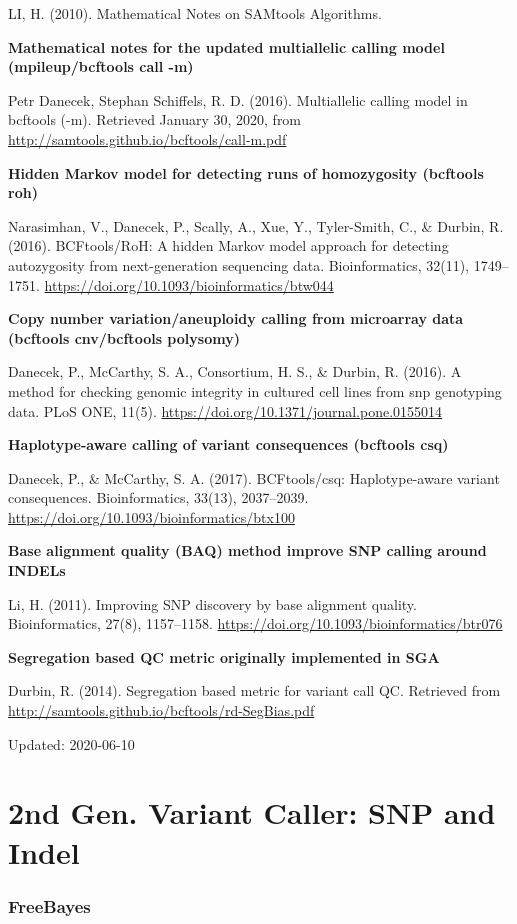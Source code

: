 \documentclass[]{article}
\begin{document}
LI, H. (2010). Mathematical Notes on SAMtools Algorithms.

\textbf{Mathematical notes for the updated multiallelic calling model (mpileup/bcftools call -m)}

Petr Danecek, Stephan Schiffels, R. D. (2016). Multiallelic calling model in bcftools (-m). Retrieved January 30, 2020, from \url{http://samtools.github.io/bcftools/call-m.pdf}

\textbf{Hidden Markov model for detecting runs of homozygosity (bcftools roh)}

Narasimhan, V., Danecek, P., Scally, A., Xue, Y., Tyler-Smith, C., \& Durbin, R. (2016). BCFtools/RoH: A hidden Markov model approach for detecting autozygosity from next-generation sequencing data. Bioinformatics, 32(11), 1749–1751. \url{https://doi.org/10.1093/bioinformatics/btw044}

\textbf{Copy number variation/aneuploidy calling from microarray data (bcftools cnv/bcftools polysomy)}


Danecek, P., McCarthy, S. A., Consortium, H. S., \& Durbin, R. (2016). A method for checking genomic integrity in cultured cell lines from snp genotyping data. PLoS ONE, 11(5). \url{https://doi.org/10.1371/journal.pone.0155014}

\textbf{Haplotype-aware calling of variant consequences (bcftools csq)}

Danecek, P., \& McCarthy, S. A. (2017). BCFtools/csq: Haplotype-aware variant consequences. Bioinformatics, 33(13), 2037–2039. \url{https://doi.org/10.1093/bioinformatics/btx100}

\textbf{Base alignment quality (BAQ) method improve SNP calling around INDELs}


Li, H. (2011). Improving SNP discovery by base alignment quality. Bioinformatics, 27(8), 1157–1158. \url{https://doi.org/10.1093/bioinformatics/btr076}

\textbf{Segregation based QC metric originally implemented in SGA}

Durbin, R. (2014). Segregation based metric for variant call QC. Retrieved from \url{http://samtools.github.io/bcftools/rd-SegBias.pdf}

Updated: 2020-06-10

\part{2nd Gen. Variant Caller: SNP and Indel}
\section{FreeBayes}
\end{document}
